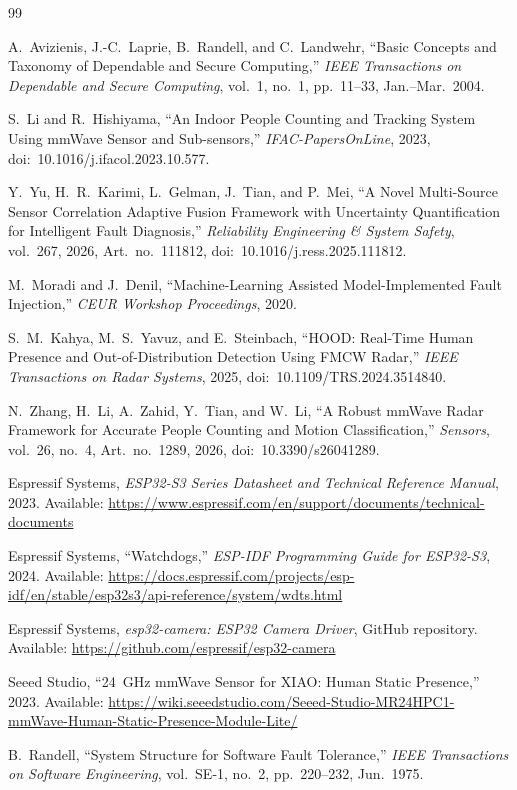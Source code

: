 \documentclass[12pt]{extarticle}
\begin{document}
\begin{thebibliography}{99}

A.~Avizienis, J.-C.~Laprie, B.~Randell, and C.~Landwehr,
``Basic Concepts and Taxonomy of Dependable and Secure Computing,''
\textit{IEEE Transactions on Dependable and Secure Computing},
vol.~1, no.~1, pp.~11--33, Jan.--Mar.\ 2004.

S.~Li and R.~Hishiyama,
``An Indoor People Counting and Tracking System Using mmWave Sensor and Sub-sensors,''
\textit{IFAC-PapersOnLine},
2023, doi:~10.1016/j.ifacol.2023.10.577.

Y.~Yu, H.~R.~Karimi, L.~Gelman, J.~Tian, and P.~Mei,
``A Novel Multi-Source Sensor Correlation Adaptive Fusion Framework with Uncertainty
Quantification for Intelligent Fault Diagnosis,''
\textit{Reliability Engineering \& System Safety},
vol.~267, 2026, Art.\ no.~111812, doi:~10.1016/j.ress.2025.111812.

M.~Moradi and J.~Denil,
``Machine-Learning Assisted Model-Implemented Fault Injection,''
\textit{CEUR Workshop Proceedings},
2020.

S.~M.~Kahya, M.~S.~Yavuz, and E.~Steinbach,
``HOOD: Real-Time Human Presence and Out-of-Distribution Detection Using FMCW Radar,''
\textit{IEEE Transactions on Radar Systems},
2025, doi:~10.1109/TRS.2024.3514840.

N.~Zhang, H.~Li, A.~Zahid, Y.~Tian, and W.~Li,
``A Robust mmWave Radar Framework for Accurate People Counting and Motion Classification,''
\textit{Sensors},
vol.~26, no.~4, Art.\ no.~1289, 2026, doi:~10.3390/s26041289.

Espressif Systems,
\textit{ESP32-S3 Series Datasheet and Technical Reference Manual},
2023.
Available: \url{https://www.espressif.com/en/support/documents/technical-documents}

Espressif Systems,
``Watchdogs,''
\textit{ESP-IDF Programming Guide for ESP32-S3},
2024.
Available: \url{https://docs.espressif.com/projects/esp-idf/en/stable/esp32s3/api-reference/system/wdts.html}

Espressif Systems,
\textit{esp32-camera: ESP32 Camera Driver},
GitHub repository.
Available: \url{https://github.com/espressif/esp32-camera}

Seeed Studio,
``24~GHz mmWave Sensor for XIAO: Human Static Presence,''
2023.
Available: \url{https://wiki.seeedstudio.com/Seeed-Studio-MR24HPC1-mmWave-Human-Static-Presence-Module-Lite/}

B.~Randell,
``System Structure for Software Fault Tolerance,''
\textit{IEEE Transactions on Software Engineering},
vol.~SE-1, no.~2, pp.~220--232, Jun.\ 1975.

\end{thebibliography}
\end{document}
